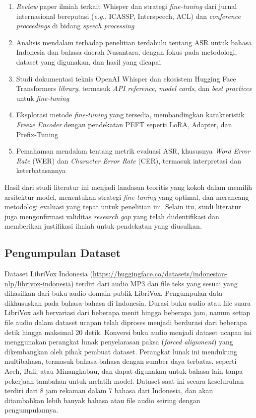 \begin{enumerate}[noitemsep]
    \item \textit{Review} paper ilmiah terkait Whisper dan strategi \textit{fine-tuning} dari jurnal internasional bereputasi (\textit{e.g.}, ICASSP, Interspeech, ACL) dan \textit{conference proceedings} di bidang \textit{speech processing}
    \item Analisis mendalam terhadap penelitian terdahulu tentang ASR untuk bahasa Indonesia dan bahasa daerah Nusantara, dengan fokus pada metodologi, dataset yang digunakan, dan hasil yang dicapai
    \item Studi dokumentasi teknis OpenAI Whisper dan ekosistem Hugging Face Transformers \textit{library}, termasuk \textit{API reference}, \textit{model cards}, dan \textit{best practices} untuk \textit{fine-tuning}
    \item Eksplorasi metode \textit{fine-tuning} yang tersedia, membandingkan karakteristik \textit{Freeze Encoder} dengan pendekatan PEFT seperti LoRA, Adapter, dan Prefix-Tuning
    \item Pemahaman mendalam tentang metrik evaluasi ASR, khususnya \textit{Word Error Rate} (WER) dan \textit{Character Error Rate} (CER), termasuk interpretasi dan keterbatasannya
\end{enumerate}

Hasil dari studi literatur ini menjadi landasan teoritis yang kokoh dalam memilih arsitektur model, menentukan strategi \textit{fine-tuning} yang optimal, dan merancang metodologi evaluasi yang tepat untuk penelitian ini. Selain itu, studi literatur juga mengonfirmasi validitas \textit{research gap} yang telah diidentifikasi dan memberikan justifikasi ilmiah untuk pendekatan yang diusulkan.

\subsection{Pengumpulan Dataset}
\label{III.Langkah3}

Dataset LibriVox Indonesia (\url{https://huggingface.co/datasets/indonesian-nlp/librivox-indonesia}) terdiri dari audio MP3 dan file teks yang sesuai yang dihasilkan dari buku audio domain publik LibriVox. Pengumpulan data dikhususkan pada bahasa-bahasa di Indonesia. Durasi buku audio atau file suara LibriVox asli bervariasi dari beberapa menit hingga beberapa jam, namun setiap file audio dalam dataset ucapan telah diproses menjadi berdurasi dari beberapa detik hingga maksimal 20 detik. Konversi buku audio menjadi dataset ucapan ini menggunakan perangkat lunak penyelarasan paksa (\textit{forced alignment}) yang dikembangkan oleh pihak pembuat dataset. Perangkat lunak ini mendukung multibahasa, termasuk bahasa-bahasa dengan sumber daya terbatas, seperti Aceh, Bali, atau Minangkabau, dan dapat digunakan untuk bahasa lain tanpa pekerjaan tambahan untuk melatih model. Dataset saat ini secara keseluruhan terdiri dari 8 jam rekaman dalam 7 bahasa dari Indonesia, dan akan ditambahkan lebih banyak bahasa atau file audio seiring dengan pengumpulannya.

